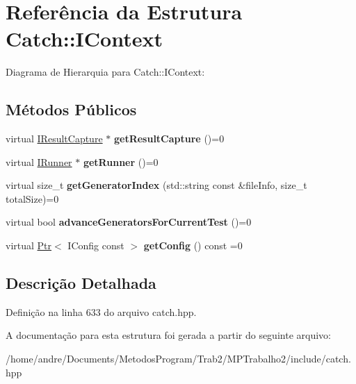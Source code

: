 \hypertarget{structCatch_1_1IContext}{}\section{Referência da Estrutura Catch\+:\+:I\+Context}
\label{structCatch_1_1IContext}


Diagrama de Hierarquia para Catch\+:\+:I\+Context\+:
\subsection*{Métodos Públicos}
\begin{DoxyCompactItemize}
\item 
virtual \hyperlink{structCatch_1_1IResultCapture}{I\+Result\+Capture} $\ast$ {\bfseries get\+Result\+Capture} ()=0\hypertarget{structCatch_1_1IContext_a684e4ae71d1fdf3060c352ecde1d122f}{}\label{structCatch_1_1IContext_a684e4ae71d1fdf3060c352ecde1d122f}

\item 
virtual \hyperlink{structCatch_1_1IRunner}{I\+Runner} $\ast$ {\bfseries get\+Runner} ()=0\hypertarget{structCatch_1_1IContext_af088415dde18d039ed5a2f95b02767c6}{}\label{structCatch_1_1IContext_af088415dde18d039ed5a2f95b02767c6}

\item 
virtual size\+\_\+t {\bfseries get\+Generator\+Index} (std\+::string const \&file\+Info, size\+\_\+t total\+Size)=0\hypertarget{structCatch_1_1IContext_a43e07088db43299ba129fbe6d3106e95}{}\label{structCatch_1_1IContext_a43e07088db43299ba129fbe6d3106e95}

\item 
virtual bool {\bfseries advance\+Generators\+For\+Current\+Test} ()=0\hypertarget{structCatch_1_1IContext_a806f7c4ed24d51adae90418e661b24b7}{}\label{structCatch_1_1IContext_a806f7c4ed24d51adae90418e661b24b7}

\item 
virtual \hyperlink{classCatch_1_1Ptr}{Ptr}$<$ I\+Config const  $>$ {\bfseries get\+Config} () const =0\hypertarget{structCatch_1_1IContext_aee81c415899262e096ad8d6f686fa365}{}\label{structCatch_1_1IContext_aee81c415899262e096ad8d6f686fa365}

\end{DoxyCompactItemize}


\subsection{Descrição Detalhada}


Definição na linha 633 do arquivo catch.\+hpp.



A documentação para esta estrutura foi gerada a partir do seguinte arquivo\+:\begin{DoxyCompactItemize}
\item 
/home/andre/\+Documents/\+Metodos\+Program/\+Trab2/\+M\+P\+Trabalho2/include/catch.\+hpp\end{DoxyCompactItemize}
